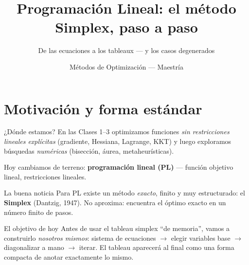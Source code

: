 \documentclass[aspectratio=169]{beamer}
\title{Programación Lineal: el método Simplex, paso a paso}
\subtitle{De las ecuaciones a los tableaux --- y los casos degenerados}
\author{Métodos de Optimización --- Maestría}
\institute{Universidad Pontificia Bolivariana}
\date{}
\begin{document}
\maketitle

\section{Motivación y forma estándar}

\begin{frame}{¿Dónde estamos?}
En las Clases 1--3 optimizamos funciones \emph{sin restricciones lineales explícitas} (gradiente, Hessiana, Lagrange, KKT) y luego exploramos búsquedas \emph{numéricas} (bisección, áurea, metaheurísticas).

\vspace{0.4cm}
Hoy cambiamos de terreno: \textbf{programación lineal (PL)} --- función objetivo lineal, restricciones lineales.
\par\medskip
\begin{block}{La buena noticia}
Para PL existe un método \emph{exacto}, finito y muy estructurado: el \textbf{Simplex} (Dantzig, 1947). No aproxima: encuentra el óptimo exacto en un número finito de pasos.
\end{block}
\par\medskip
\begin{alertblock}{El objetivo de hoy}
Antes de usar el tableau simplex ``de memoria'', vamos a construirlo \emph{nosotros mismos}: sistema de ecuaciones $\to$ elegir variables base $\to$ diagonalizar a mano $\to$ iterar. El tableau aparecerá al final como una forma compacta de anotar exactamente lo mismo.
\end{alertblock}
\end{frame}
\end{document}
